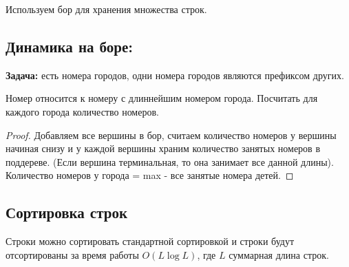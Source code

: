 Используем бор для хранения множества строк.

\subsection{Динамика на боре:}
\textbf{Задача:} есть номера городов, одни номера городов являются префиксом других.

Номер относится к номеру с длиннейшим номером города. Посчитать для каждого города количество номеров.

\begin{proof}
Добавляем все вершины в бор, считаем количество номеров у вершины начиная снизу и у каждой вершины храним количество занятых номеров
в поддереве. (Если вершина терминальная, то она занимает все данной длины). Количество номеров у города = max - все занятые номера детей.
\end{proof}

\subsection{Сортировка строк}
Строки можно сортировать стандартной сортировкой и 
строки будут отсортированы за время работы $O(L \log L)$, где
$L$ суммарная длина строк.
